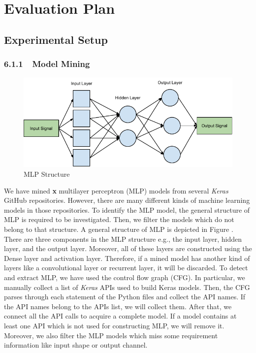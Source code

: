 \section{Evaluation Plan}
\label{sec:evaluation}
\subsection{Experimental Setup}
\subsubsection{\textbf{6.1.1~~Model Mining}}
\begin{figure}
	\includegraphics[width=0.8\linewidth]{mlp}
	\centering
	\caption{MLP Structure}
	\label{fig:mlp}
\end{figure}
We have mined {\bf x} multilayer perceptron (MLP) models from several \emph{Keras} GitHub repositories. However, there are many different kinds of machine learning models in those repositories. To identify the MLP model, the general structure of MLP is required to be investigated. Then, we filter the models which do not belong to that structure.  A general structure of MLP is depicted in Figure . There are three components in the MLP structure e.g., the input layer, hidden layer, and the output layer. Moreover, all of these layers are constructed using the Dense layer and activation layer. Therefore, if a mined model has another kind of layers like a convolutional layer or recurrent layer, it will be discarded. To detect and extract MLP, we have used the control flow graph (CFG). In particular, we manually collect a list of \emph{Keras} APIs used to build Keras models. Then, the CFG parses through each statement of the Python files and collect the API names. If the API names belong to the APIs list, we will collect them. After that, we connect all the API calls to acquire a complete model. If a model contains at least one API which is not used for constructing MLP, we will remove it. Moreover, we also filter the MLP models which miss some requirement information like input shape or output channel.
